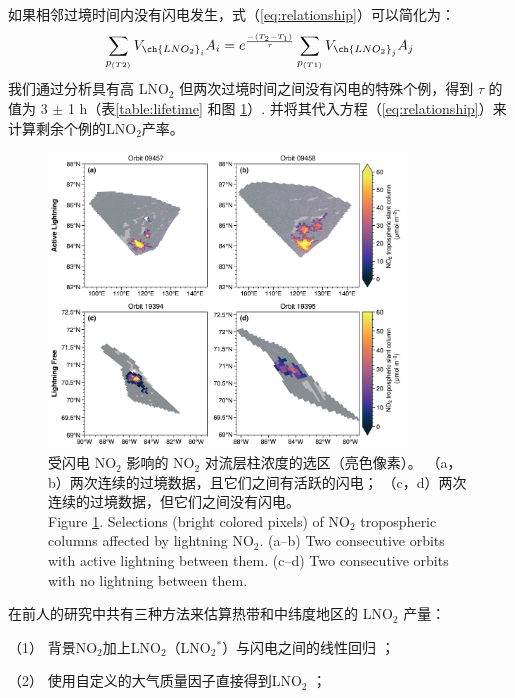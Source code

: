如果相邻过境时间内没有闪电发生，式（\ref{eq:relationship}）可以简化为：
\begin{equation} \label{eq:LNO2_nolightning}
\sum_{p_{(T2)}} V_{\ch{LNO_2}_i} A_{i} = e^\frac{{-(T_2-T_1)}}{\tau} \sum_{p_{(T1)}} V_{\ch{LNO_2}_j} A_{j}
\end{equation}
我们通过分析具有高 LNO$_2$ 但两次过境时间之间没有闪电的特殊个例，得到 $\tau$ 的值为 3 $\pm$ 1 h（表\ref{table:lifetime} 和图 \ref{fig:consecutive_orbits}）.
并将其代入方程（\ref{eq:relationship}）来计算剩余个例的LNO$_2$产率。


\begin{figure}[H]
\centering
\includegraphics[width=0.85\textwidth]{./figures/arctic_consecutive_orbits.png}
\caption{
受闪电 NO$_2$ 影响的 NO$_2$ 对流层柱浓度的选区（亮色像素）。
（a，b）两次连续的过境数据，且它们之间有活跃的闪电；
（c，d）两次连续的过境数据，但它们之间没有闪电。\\
Figure \ref{fig:consecutive_orbits}.
Selections (bright colored pixels) of NO$_2$ tropospheric columns affected by lightning NO$_2$.
(a--b) Two consecutive orbits with active lightning between them.
(c--d) Two consecutive orbits with no lightning between them.
}
\label{fig:consecutive_orbits}
\end{figure}


在前人的研究中共有三种方法来估算热带和中纬度地区的 LNO$_2$ 产量：

（1） 背景NO$_2$加上LNO$_2$（LNO$_2$$^*$）与闪电之间的线性回归 \citep{Pickering.2016,Allen.2019,Lapierre.2020}；

（2） 使用自定义的大气质量因子直接得到LNO$_2$ \citep{Beirle.2009,Zhang.2020b,Zhang.2022a}；

